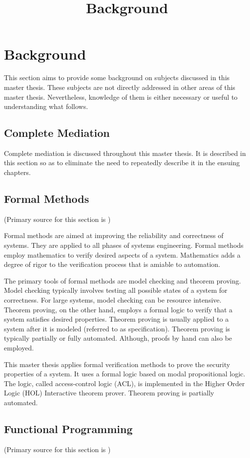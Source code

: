 \documentclass[../../main/main.tex]{subfiles}
\begin{document}
\title{Background}

\chapter{Background}
This section aims to provide some background on subjects discussed in this master thesis.  These subjects are not directly addressed in other areas of this master thesis.  Nevertheless, knowledge of them is either necessary or useful to understanding what follows.

\section{Complete Mediation}
Complete mediation is discussed throughout this master thesis.  It is described in this section so as to eliminate the need to repeatedly describe it in the ensuing chapters.

\section{Formal Methods}
(Primary source for this section is \cite{wikiformalmethods})

Formal methods are aimed at improving the reliability and correctness of systems\cite{formalmethodslcarke}.  They are applied to all phases of systems engineering.  Formal methods employ mathematics to verify desired aspects of a system.  Mathematics adds a degree of rigor to the verification process that is amiable to automation.  

The primary tools of formal methods are model checking and theorem proving.  Model checking typically involves testing all possible states of a system for correctness. For large systems, model checking can be resource intensive.  Theorem proving, on the other hand, employs a formal logic to verify that a system satisfies desired properties.  Theorem proving is usually applied to a system after it is modeled (referred to as specification).   Theorem proving is typically partially or fully automated.  Although, proofs by hand can also be employed. 

This master thesis applies formal verification methods to prove the security properties of a system. It uses a formal logic based on modal propositional logic.  The logic, called access-control logic (ACL), is implemented in the Higher Order Logic (HOL) Interactive theorem prover.  Theorem proving is partially automated. 

\section{Functional Programming}
(Primary source for this section is \cite{functionalprogramming})
\end{document}
